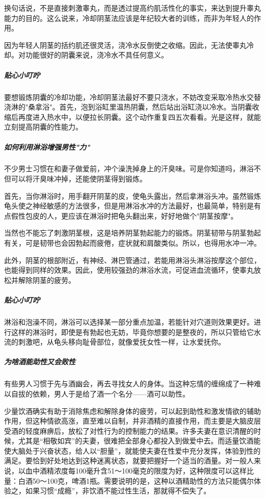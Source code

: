 换句话说，不是直接刺激睾丸，而是透过提高约肌活性化的事实，来达到提升睾丸能力的目的。这么说来，冷却阴茎法应该是年纪较大者的训练，而非为年轻人的作用。

因为年轻人阴茎的括约肌还很灵活，浇冷水反倒使之收缩。因此，无法使睾丸冷却。对功能很好的阴囊来说，浇冷水不具任何意义。

\subparagraph{贴心小叮咛}

要想锻炼阴囊的冷却功能，冷却阴茎法最好不要只浇水，不妨改变采取冷热水交替浇淋的"桑拿浴"。首先，泡到浴缸里温热阴囊，然后站出浴缸浇以冷水。当阴囊收缩后再度进入热水中，以便拉长阴囊。这个动作重复四五次看看。光是这样，就能立刻提高阴囊的性能力。

\subparagraph{如何利用淋浴增强男性"力"}

不少男士习惯在和妻子做爱前，冲个澡洗掉身上的汗臭味。可是你知道吗，淋浴不但可以将汗臭味冲掉，还能使阴茎得到锻炼。

首先，当你淋浴时，用手翻开阴茎的皮，使龟头露出，然后拿淋浴头冲。虽然锻炼龟头使之神经敏感的方法很多，但是用淋浴水冲的方法最好，也最简单，特别是有点假性包皮的人，更应该在淋浴时把龟头翻出来，好好地做个"阴茎按摩"。

当然也不能忘了刺激阴茎根，这是培养阴茎勃起能力的锻炼。阴茎韧带与阴茎勃起有关，可是韧带也会因勃起而疲倦，症状就和肩酸类似。所以，也得用水冲一冲。

此外，阴茎的根部附近，有神经、淋巴管通过，若能用淋浴头淋浴按摩这个部位，也能得到同样的效果。因此，使用较强劲的淋浴水流，可促进血流循环，使睾丸放松并解除阴茎的疲劳。

\subparagraph{贴心小叮咛}

淋浴和泡澡不同，淋浴可以选择某一部分重点加温，若能针对穴道则效果更好。进行这样的淋浴时，即使是有勃起也无妨，毕竟你想要的是整夜的，所以只管给它水流的刺激吧，从龟头移向耻骨部位，就像爱抚女性一样，让水爱抚你。

\subparagraph{为啥酒能助性又会败性}

有些男人习惯于先与酒幽会，再去寻找女人的身体。当这种忘情的缠绵成了一种难以自拔的依赖，男人于是给了酒一个名分——酒可以助性。

少量饮酒确实有助于消除焦虑和解除身体的疲劳，可以起到助性和激发情欲的辅助作用，但这种情欲高涨，直至难以自制，并非酒精的直接作用，而主要是大脑皮层受酒的轻度麻痹后，放松了对性行为的控制能力的结果。许多夫妻在意识清醒的时候，尤其是“相敬如宾”的夫妻，很难把全部身心都投入到做爱中去。而适量饮酒能使大脑处于兴奋状态，给人以“胆量”，就能使夫妻在性爱中充分发挥，体验到性的满足。要恰到好处地达到这种迷离状态，就要把握好一个适当的酒量。对一般人来说，以血中酒精浓度每100毫升含51～100毫克的限度为好，这种限度可以这样比量：白酒50～100克，啤酒1瓶。需要说明的是，这种以酒精助性的方法只能偶尔体验之，如果习惯“成瘾”，非饮酒不能过性生活，那就得不偿失了。

